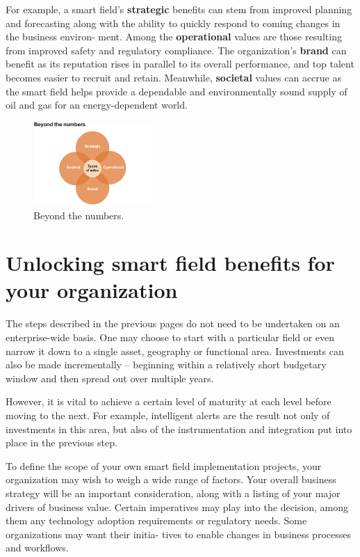 \documentclass[twocolumn]{article}
\begin{document}
For example, a smart field’s \textbf{strategic} benefits can stem from improved planning and forecasting along with the ability to quickly respond to coming changes in the business environ- ment. Among the \textbf{operational} values are those resulting from improved safety and regulatory compliance. The organization’s \textbf{brand} can benefit as its reputation rises in parallel to its overall performance, and top talent becomes easier to recruit and retain. Meanwhile, \textbf{societal} values can accrue as the smart field helps provide a dependable and environmentally sound supply of oil and gas for an energy-dependent world.
\begin{figure}[htb]
      \centering
      \includegraphics[width=0.4\textwidth]{figure04}
      \caption{Beyond the numbers.}
      \label{fig4}
\end{figure}

\section{Unlocking smart field benefits for your organization}
The steps described in the previous pages do not need to be undertaken on an enterprise-wide basis. One may choose to start with a particular field or even narrow it down to a single asset, geography or functional area. Investments can also
be made incrementally – beginning within a relatively short budgetary window and then spread out over multiple years.

However, it is vital to achieve a certain level of maturity at each level before moving to the next. For example, intelligent alerts are the result not only of investments in this area, but also of the instrumentation and integration put into place in the previous step.

To define the scope of your own smart field implementation projects, your organization may wish to weigh a wide range
of factors. Your overall business strategy will be an important consideration, along with a listing of your major drivers of business value. Certain imperatives may play into the decision, among them any technology adoption requirements or regulatory needs. Some organizations may want their initia- tives to enable changes in business processes and workflows.
\end{document}
